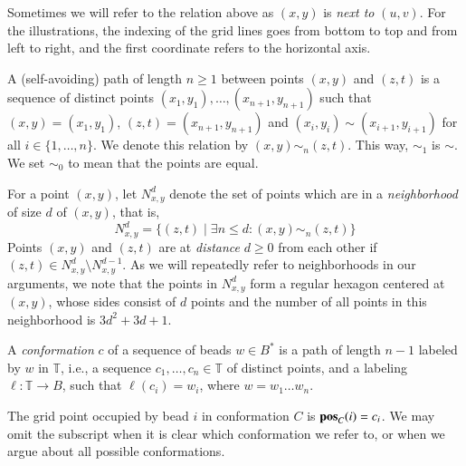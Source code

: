 \documentclass[]{llncs}
\newcommand{\pos}{\mathrm{\bf pos}}
\begin{document}
\noindent Sometimes we will refer to the relation above as $(x,y)$ is \textit{next to} $(u,v)$. For the illustrations, the indexing of the grid lines goes from bottom to top and from left to right, and the first coordinate refers to the horizontal axis.

A (self-avoiding) path of length $n\geq 1$ between points $(x,y)$ and $(z,t)$ is a sequence of distinct points $(x_1,y_1),\dots,(x_{n+1},y_{n+1})$ such that $(x,y)=(x_1,y_1)$, $(z,t)=(x_{n+1},y_{n+1})$ and $(x_i,y_i)\sim (x_{i+1},y_{i+1})$ for all $i\in\{1,\dots,n\}$. We denote this relation by $(x,y)\sim_n (z,t)$. This way, $\sim_1$ is $\sim$. We set $\sim_0$ to mean that the points are equal.

For a point $(x,y)$, let $N_{x,y}^d$ denote the set of points which are in a \textit{neighborhood} of size $d$ of $(x,y)$, that is,
$$N_{x,y}^d = \{ (z,t) \mid \exists n\leq d: (x,y)\sim_n (z,t) \}$$
Points $(x,y)$ and $(z,t)$ are at \textit{distance} $d\geq 0$ from each other if $(z,t)\in N_{x,y}^d\setminus N_{x,y}^{d-1}$. As we will repeatedly refer to neighborhoods in our arguments, we note that the points in $N_{x,y}^d$ form a regular hexagon centered at $(x,y)$, whose sides consist of $d$ points and the number of all points in this neighborhood is $3d^2+3d+1$.

\bigskip

A \textit{conformation} $c$ of a sequence of beads $w\in B^*$ is a path of length $n-1$ labeled by $w$ in $\mathbb{T}$, i.e., a sequence $c_1,\dots , c_n\in \mathbb{T}$ of distinct points, and a labeling $\ell: \mathbb{T}\rightarrow B$, such that $\ell(c_i)=w_i$, where $w=w_1\dots w_n$.



The grid point occupied by bead $i$ in conformation $C$ is $\pos_C(i)=c_i$. We may omit the subscript when it is clear which conformation we refer to, or when we argue about all possible conformations.
\end{document}
